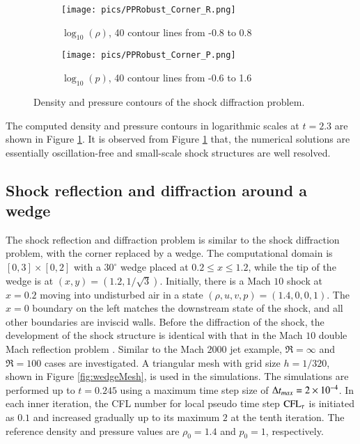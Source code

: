 \begin{figure}[htbp]
    \centering
    \begin{subfigure}{0.5\textwidth}
        \texttt{[image: pics/PPRobust\_Corner\_R.png]}
        \caption[]{$\log_{10}(\rho)$, 40 contour lines from -0.8 to 0.8}
    \end{subfigure}\hfill
    \begin{subfigure}{0.5\textwidth}
        \texttt{[image: pics/PPRobust\_Corner\_P.png]}
        \caption[]{$\log_{10}(p)$, 40 contour lines from -0.6 to 1.6}
    \end{subfigure}
    \caption{Density and pressure contours of the shock diffraction problem.}
    \label{fig:Corner}
\end{figure}

The computed density and pressure contours in logarithmic scales at $t=2.3$ are shown in Figure \ref{fig:Corner}.
It is observed from Figure \ref{fig:Corner} that,
the numerical solutions are essentially oscillation-free and small-scale shock structures are well resolved.


\subsection{Shock reflection and diffraction around a wedge}

The shock reflection and diffraction problem \cite{zhang2017positivity} is similar to the shock diffraction problem,
with the corner replaced by a wedge. The computational domain is $[0,3]\times[0,2]$
with a $30^\circ$ wedge placed at $0.2 \leq x \leq 1.2$, while the
tip of the wedge is at $(x,y) = (1.2, 1/\sqrt{3})$.
Initially, there is a Mach $10$ shock at $x=0.2$ moving into undisturbed air in a state $(\rho, u, v, p) = (1.4,0,0,1)$. The $x=0$ boundary on
the left matches the downstream state of the shock, and all other boundaries
are inviscid walls.
Before the diffraction of the shock, the development
of the shock structure is identical with that in the Mach $10$ double Mach reflection problem \cite{woodward1984dmr}.
Similar to the Mach $2000$ jet example, $\Re=\infty$ and $\Re=100$ cases
are investigated. A triangular mesh with grid size $h = 1/320$,
shown in Figure \ref{fig:wedgeMesh}, is used in the simulations.
The simulations are performed up to $t=0.245$ using
a maximum time step size of $\mathrm\Delta t_{max}= 2\times10^{-4}$.
In each inner iteration, the CFL number for local pseudo time step $\text{CFL}_\tau$ is initiated as $0.1$
and increased gradually up to its maximum $2$ at the tenth iteration.
The reference density and pressure values are $\rho_0=1.4$ and $p_0=1$, respectively.

